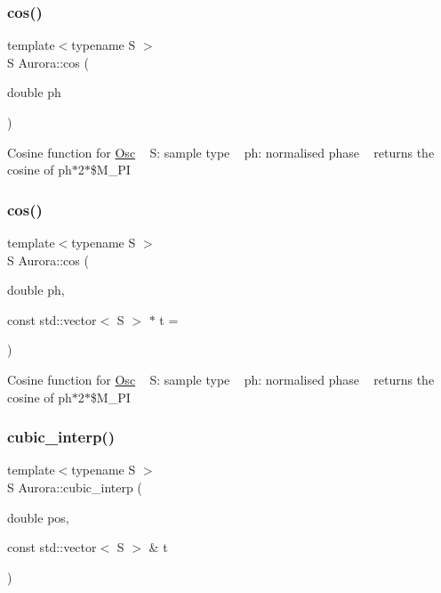 \subsubsection{\texorpdfstring{cos()}{cos()}\hspace{0.1cm}{\footnotesize\ttfamily [1/2]}}
{\footnotesize\ttfamily template$<$typename S $>$ \\
S Aurora\+::cos (\begin{DoxyParamCaption}\item[{double}]{ph }\end{DoxyParamCaption})}

Cosine function for \hyperlink{class_aurora_1_1_osc}{Osc} ~\newline
S\+: sample type ~\newline
ph\+: normalised phase ~\newline
returns the cosine of ph$\ast$2$\ast$\$\+M\+\_\+\+PI \mbox{\label{namespace_aurora_a0269c3758ab62d6a910cd8f7ace7fba2}} 
\subsubsection{\texorpdfstring{cos()}{cos()}\hspace{0.1cm}{\footnotesize\ttfamily [2/2]}}
{\footnotesize\ttfamily template$<$typename S $>$ \\
S Aurora\+::cos (\begin{DoxyParamCaption}\item[{double}]{ph,  }\item[{const std\+::vector$<$ S $>$ $\ast$}]{t = {} }\end{DoxyParamCaption})\hspace{0.3cm}{\ttfamily [inline]}}

Cosine function for \hyperlink{class_aurora_1_1_osc}{Osc} ~\newline
S\+: sample type ~\newline
ph\+: normalised phase ~\newline
returns the cosine of ph$\ast$2$\ast$\$\+M\+\_\+\+PI \mbox{\label{namespace_aurora_a35b9cf383290bddedd82b7c3d0f05e81}} 
\subsubsection{\texorpdfstring{cubic\+\_\+interp()}{cubic\_interp()}}
{\footnotesize\ttfamily template$<$typename S $>$ \\
S Aurora\+::cubic\+\_\+interp (\begin{DoxyParamCaption}\item[{double}]{pos,  }\item[{const std\+::vector$<$ S $>$ \&}]{t }\end{DoxyParamCaption})\hspace{0.3cm}{\ttfamily [inline]}}

